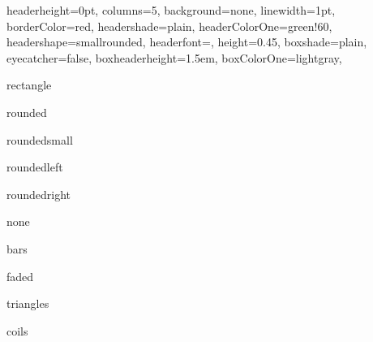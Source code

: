 \documentclass[portrait,fontscale=1,margin=0.2cm,paperwidth=15truecm, paperheight=3.5cm,debug]{baposter}
\begin{document}
\begin{poster}{
  headerheight=0pt,
  columns=5,
  background=none,
  linewidth=1pt,
  borderColor=red,
  headershade=plain,
  headerColorOne=green!60,
  headershape=smallrounded,
  headerfont={},
  height=0.45,
  boxshade=plain,
  eyecatcher=false,
  boxheaderheight=1.5em,
  boxColorOne=lightgray,
}{}{}{}{}

\begin{posterbox}[column=0,textborder=rectangle]{ }
rectangle
\end{posterbox}

\begin{posterbox}[column=1,textborder=rounded]{ }
rounded
\end{posterbox}

\begin{posterbox}[column=2,textborder=roundedsmall]{ }
roundedsmall
\end{posterbox}

\begin{posterbox}[column=3,textborder=roundedleft]{ }
roundedleft
\end{posterbox}

\begin{posterbox}[column=4,textborder=roundedright]{ }
roundedright
\end{posterbox}




\begin{posterbox}[column=0,row=0.55,textborder=none]{ }
none
\end{posterbox}

\begin{posterbox}[column=1,row=0.55,textborder=bars]{ }
bars
\end{posterbox}

\begin{posterbox}[column=2,row=0.55,textborder=faded]{ }
faded
\end{posterbox}

\begin{posterbox}[column=3,row=0.55,textborder=triangles]{ }
triangles
\end{posterbox}

\begin{posterbox}[column=4,row=0.55,linewidth=0.5pt,textborder=coils]{ }
coils
\end{posterbox}

\end{poster}
\end{document}
